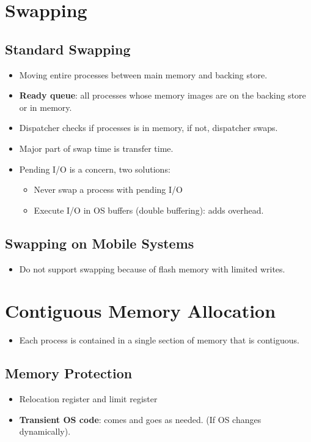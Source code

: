 \documentclass[10pt]{report}
\begin{document}
	\section{Swapping}
		\subsection{Standard Swapping}
			\begin{itemize}
				\item Moving entire processes between main memory and backing store.
				\item \textbf{Ready queue}: all processes whose memory images are on the backing store or in memory.
				\item Dispatcher checks if processes is in memory, if not, dispatcher swaps.
				\item Major part of swap time is transfer time.
				\item Pending I/O is a concern, two solutions:
				\begin{itemize}
					\item Never swap a process with pending I/O
					\item Execute I/O in OS buffers (double buffering): adds overhead.
				\end{itemize}
			\end{itemize}

		\subsection{Swapping on Mobile Systems}
			\begin{itemize}
				\item Do not support swapping because of flash memory with limited writes.
			\end{itemize}


	\section{Contiguous Memory Allocation}
		\begin{itemize}
			\item Each process is contained in a single section of memory that is contiguous.
		\end{itemize}

		\subsection{Memory Protection}
			\begin{itemize}
				\item Relocation register and limit register
				\item \textbf{Transient OS code}: comes and goes as needed. (If OS changes dynamically).
			\end{itemize}
\end{document}
